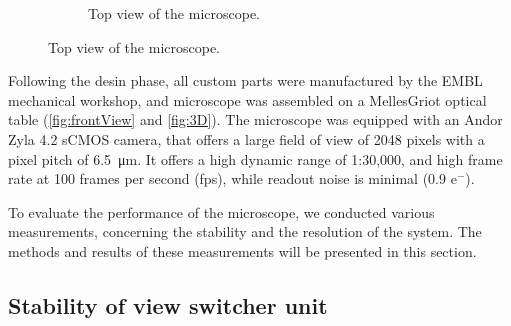 \begin{figure}
\begin{subfigure}[t]{1\textwidth}
      \caption{Top view of the microscope.}
    \end{subfigure}
    \label{fig:frontView}
  \end{figure}


  Following the desin phase, all custom parts were manufactured by the EMBL mechanical workshop, and microscope was assembled on a MellesGriot optical table (\autoref{fig:frontView} and \autoref{fig:3D}). The microscope was equipped with an Andor Zyla 4.2 sCMOS camera, that offers a large field of view of 2048 pixels with a pixel pitch of \SI{6.5}{\micro m}. It offers a high dynamic range of 1:30,000, and high frame rate at 100 frames per second (fps), while readout noise is minimal (0.9 e$^-$).
  
  To evaluate the performance of the microscope, we conducted various measurements, concerning the stability and the resolution of the system. The methods and results of these measurements will be presented in this section.


  \subsection{Stability of view switcher unit}
    \label{sec:mirrorStability}


